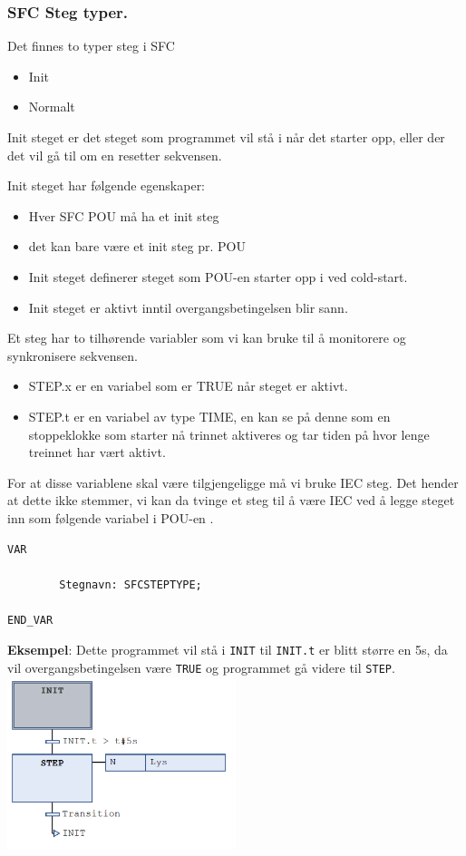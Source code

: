 \subsubsection{SFC Steg typer. }

Det finnes to typer steg i SFC
\begin{itemize}
\item Init
\item Normalt
\end{itemize}

Init steget er det steget som programmet vil stå i når det starter opp, eller der det vil gå til om en resetter sekvensen. 

Init steget har følgende egenskaper:
\begin{itemize}
	\item Hver SFC POU må ha et init steg
	\item det kan bare være et init steg pr. POU
	\item Init steget definerer steget som POU-en starter opp i ved cold-start. 
	\item Init steget er aktivt inntil overgangsbetingelsen blir sann. 
\end{itemize}

Et steg har to tilhørende variabler som vi kan bruke til å monitorere og synkronisere sekvensen. 
\begin{itemize}
	\item STEP.x er en variabel som er TRUE når steget er aktivt. 
	\item STEP.t er en variabel av type TIME, en kan se på denne som en stoppeklokke som starter nå trinnet aktiveres og tar tiden på hvor lenge treinnet har vært aktivt. 
\end{itemize}



For at disse variablene skal være tilgjengeligge må vi bruke IEC steg. Det hender at dette ikke stemmer, vi kan da tvinge et steg til å være IEC ved å legge steget inn som følgende variabel i POU-en . 
\begin{verbatim}
VAR

        Stegnavn: SFCSTEPTYPE;

END_VAR
\end{verbatim}

\textbf{Eksempel}:
Dette programmet vil stå i \verb|INIT| til \verb|INIT.t| er blitt større en 5s, da vil overgangsbetingelsen være \verb|TRUE| og programmet gå videre til \verb|STEP|.
\vskip 2.5pt 
\includegraphics[width=0.5\textwidth]{SFC14.png}

